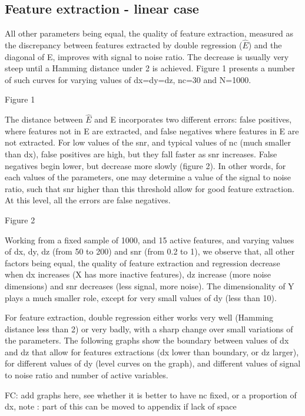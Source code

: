 \documentclass{article}
\begin{document}
\subsection{Feature extraction - linear case}
All other parameters being equal, the quality of feature extraction, measured as the discrepancy between features extracted by double regression ($\hat E$) and the diagonal of E, improves with signal to noise ratio. The decrease is usually very steep until a Hamming distance under 2 is achieved. Figure 1 presents a number of such curves for varying values of dx=dy=dz, nc=30 and N=1000. 

Figure 1

The distance between $\hat E$ and E incorporates two different errors: false positives, where features not in E are extracted, and false negatives where features in E are not extracted. For low values of the snr, and typical values of nc (much smaller than dx), false positives are high, but they fall faster as snr increases. False negatives begin lower, but decrease more slowly (figure 2). In other words, for each values of the parameters, one may determine a value of the signal to noise ratio, such that snr higher than this threshold allow for good feature extraction. At this level, all the errors are false negatives. 

Figure 2 

Working from a fixed sample of 1000, and 15 active features, and varying values of dx, dy, dz (from 50 to 200) and snr (from 0.2 to 1), we observe that, all other factors being equal, the quality of feature extraction and regression decrease when dx increases (X has more inactive features), dz increase (more noise dimensions) and snr decreases (less signal, more noise). The dimensionality of Y plays a much smaller role, except for very small values of dy (less than 10). 

For feature extraction, double regression either works very well (Hamming distance less than 2) or very badly, with a sharp change over small variations of the parameters. The following graphs show the boundary between values of dx and dz that allow for features extractions (dx lower than boundary, or dz larger), for different values of dy (level curves on the graph), and different values of signal to noise ratio and number of active variables.

FC: add graphs here, see whether it is better to have nc fixed, or a proportion of dx, note : part of this can be moved to appendix if lack of space
\end{document}
